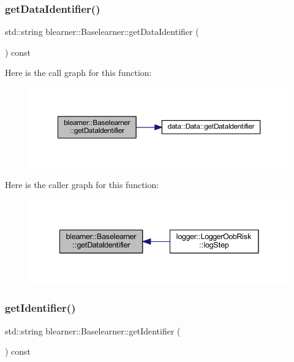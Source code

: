 \subsubsection{\texorpdfstring{get\+Data\+Identifier()}{getDataIdentifier()}}
{\footnotesize\ttfamily std\+::string blearner\+::\+Baselearner\+::get\+Data\+Identifier (\begin{DoxyParamCaption}{ }\end{DoxyParamCaption}) const}

Here is the call graph for this function\+:\nopagebreak
\begin{figure}[H]
\begin{center}
\leavevmode
\includegraphics[width=350pt]{classblearner_1_1_baselearner_a2393dc1e3cf90919ebbbd237fe303860_cgraph}
\end{center}
\end{figure}
Here is the caller graph for this function\+:
\nopagebreak
\begin{figure}[H]
\begin{center}
\leavevmode
\includegraphics[width=341pt]{classblearner_1_1_baselearner_a2393dc1e3cf90919ebbbd237fe303860_icgraph}
\end{center}
\end{figure}
\mbox{\label{classblearner_1_1_baselearner_aa10fa4301aeb37f6e8c18457541c3be7}} 
\subsubsection{\texorpdfstring{get\+Identifier()}{getIdentifier()}}
{\footnotesize\ttfamily std\+::string blearner\+::\+Baselearner\+::get\+Identifier (\begin{DoxyParamCaption}{ }\end{DoxyParamCaption}) const}

